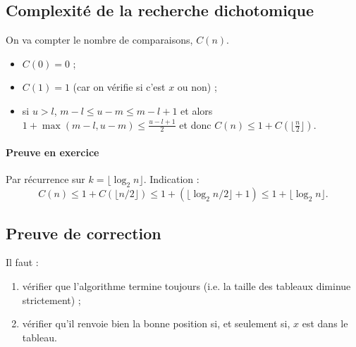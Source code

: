 \documentclass{mybourbaki}
\begin{document}
\subsection{Complexité de la recherche dichotomique}

On va compter le nombre de comparaisons, $C(n)$.
\begin{itemize}
\item $C(0) = 0$ ;
\item $C(1) =1$ (car on vérifie si c'est $x$ ou non) ;
\item si $u>l$, $m-l \leq u - m \leq m-l+1$ et alors $1+\max(m-l,u-m) \leq \frac{u-l+1}{2}$ et donc $C(n) \leq 1 + C(\lfloor \frac{n}{2}\rfloor)$.
\end{itemize}

\paragraph{Preuve en exercice}Par récurrence sur $k = \lfloor \log_2 n \rfloor$. Indication : \[ C(n) \leq 1 + C(\lfloor n/2 \rfloor) \leq 1 + (\lfloor \log_2 n/2 \rfloor + 1) \leq 1 + \lfloor \log_2 n \rfloor.\]

\subsection{Preuve de correction}
Il faut :
\begin{enumerate}
\item vérifier que l'algorithme termine toujours (i.e. la taille des tableaux diminue strictement) ;
\item vérifier qu'il renvoie bien la bonne position si, et seulement si, $x$ est dans le tableau.
\end{enumerate}
\end{document}
